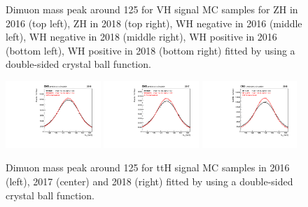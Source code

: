 \begin{figure}[h!]
    \caption{Dimuon mass peak around 125 \gev for VH signal MC samples for ZH in 2016 (top left), ZH in 2018 (top right), WH negative in 2016 (middle left), WH negative in 2018 (middle right), WH positive in 2016 (bottom left), WH positive in 2018 (bottom right) fitted by using a double-sided crystal ball function.}
    \label{fig:dimu_mass_VH}
\end{figure}

\begin{figure}[h!]
    \centering
    \includegraphics[width=0.32\textwidth]{images_geofit/ttH_mass_geofit_2016.pdf}
    \includegraphics[width=0.32\textwidth]{images_geofit/ttH_mass_geofit_2017.pdf}
    \includegraphics[width=0.32\textwidth]{images_geofit/ttH_mass_geofit_2018.pdf}
    \caption{Dimuon mass peak around 125 \gev for ttH signal MC samples in 2016 (left), 2017 (center) and 2018 (right) fitted by using a double-sided crystal ball function.}
    \label{fig:dimu_mass_ttH}
\end{figure}


